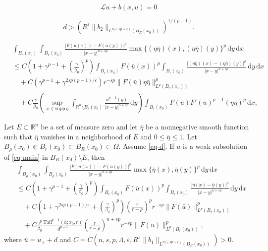\documentclass[10pt,a4paper]{amsart}
\begin{document}
	\begin{equation}\label{eq-main}
		\mathcal{L}u+b(x, u)=0
	\end{equation}

\begin{equation}\label{eq-d}
d > \left( R^{\varepsilon}\|b_2\|_{L^{n/(sp-\varepsilon)}(B_R(x_0))} \right)^{1/(p-1)}.
\end{equation}

\begin{equation}\label{eq-Caccio1}
\begin{split}
&\int_{B_r(x_0)} \int_{B_r(x_0)} \frac{|F(\bar{u}(x))-F(\bar{u}(y))|^p}{|x-y|^{n+sp}} \max\{ (\eta\bar{\eta})(x), (\eta\bar{\eta})(y) \}^p \,\mathrm{d}y \,\mathrm{d}x \\
&\leq C \left( 1+\gamma^{p-1}+\left( \frac{\gamma}{\beta_0} \right)^p \right) \int_{B_r(x_0)} F(\bar{u}(x))^p \int_{B_r(x_0)} \frac{|(\eta\bar{\eta})(x)-(\eta\bar{\eta})(y)|^p}{|x-y|^{n+sp}} \,\mathrm{d}y\,\mathrm{d}x \\
&\quad + C \left( \gamma^{p-1} + \gamma^{2sp(p-1)/\varepsilon} \right) r^{-sp} \|F(\bar{u})\eta\bar{\eta}\|_{L^p(B_r(x_0))}^p \\
&\quad + C \frac{\gamma}{\beta_0} \left( \sup_{x \in \mathrm{supp} \, \eta} \int_{\mathbb{R}^n \setminus B_r(x_0)} \frac{\bar{u}^{p-1}(y)}{|x-y|^{n+sp}} \,\mathrm{d}y \right) \int_{B_r(x_0)} F(\bar{u}) F'(\bar{u})^{p-1} (\eta\bar{\eta})^p \,\mathrm{d}x,
\end{split}
\end{equation}

\begin{lemma}\label{lem-Caccio2}
Let $E \subset \mathbb{R}^n$ be a set of measure zero and let $\bar{\eta}$ be a nonnegative smooth function such that $\bar{\eta}$ vanishes in a neighborhood of $E$ and $0\leq\bar{\eta}\leq1$. Let $B_\rho(x_0) \Subset B_r(x_0) \subset B_R(x_0) \subset \Omega$. Assume \eqref{eq-d}. If $u$ is a weak subsolution of \eqref{eq-main} in $B_R(x_0) \setminus E$, then
\begin{equation}\label{eq-Caccio2}
\begin{split}
&\int_{B_\rho(x_0)} \int_{B_\rho(x_0)} \frac{|F(\bar{u}(x))-F(\bar{u}(y))|^p}{|x-y|^{n+sp}} \max\{ \bar{\eta}(x), \bar{\eta}(y) \}^p \,\mathrm{d}y \,\mathrm{d}x \\
&\leq C\left( 1+\gamma^{p-1}+\left( \frac{\gamma}{\beta_0} \right)^p \right) \int_{B_r(x_0)} F(\bar{u}(x))^p \int_{B_r(x_0)} \frac{|\bar{\eta}(x)-\bar{\eta}(y)|^p}{|x-y|^{n+sp}} \,\mathrm{d}y\,\mathrm{d}x \\
&\quad + C\left( 1+\gamma^{2sp(p-1)/\varepsilon}+\left( \frac{\gamma}{\beta_0} \right)^p \right) \left( \frac{r}{r-\rho} \right)^p r^{-sp}\|F(\bar{u})\|_{L^p(B_r(x_0))}^p \\
&\quad + C\frac{\gamma^p}{\beta_0} \frac{\mathrm{Tail}^{p-1}(\bar{u}; x_0, r)}{d^{p-1}} \left( \frac{r}{r-\rho} \right)^{n+sp} r^{-sp}\|F(\bar{u})\|_{L^p(B_r(x_0))}^p,
\end{split}
\end{equation}
where $\bar{u}=u_++d$ and $C=C(n, s, p, \Lambda, \varepsilon, R^{\varepsilon}\|b_1\|_{L^{n/(sp-\varepsilon)}(B_R(x_0))})>0$.
\end{lemma}
\end{document}
